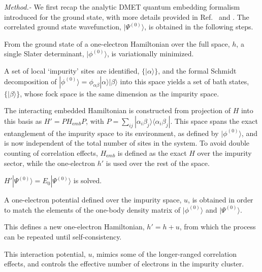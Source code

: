 \documentclass[aps,showpacs,twocolumn,nobibnotes]{revtex4}
\begin{document}
\emph{Method.-} We first recap the analytic DMET quantum embedding formalism introduced for the ground state, with more details provided in
Ref.~ and . The correlated ground state wavefunction, $|\Psi^{(0)} \rangle$, is obtained in the following steps.
\begin{inparaenum}
\item From the ground state of a one-electron Hamiltonian over the full space, $h$, a single Slater determinant, $|\phi^{(0)}\rangle$, is variationally minimized.
\item A set of local `impurity' sites are identified, $\{ |\alpha \rangle \}$, and the formal Schmidt decomposition of $|\phi^{(0)}\rangle = \phi_{\alpha \beta} |\alpha \rangle |\beta \rangle$ into this space
yields a set of bath states, $\{ |\beta \rangle \}$, whose fock space is the same dimension as the impurity space.
\item The interacting embedded Hamiltonian is constructed from projection of $H$ into this basis as $H'=PH_{\mathrm emb}P$, with $P = \sum_{i j} |\alpha_i \beta_j \rangle \langle \alpha_i \beta_j |$. This space spans the exact entanglement of the impurity space to its environment, as defined by $|\phi^{(0)}\rangle$, and is now independent of the total number of sites in the system. To avoid double counting
of correlation effects, $H_{\mathrm emb}$ is defined as the exact $H$ over the impurity sector, while the one-electron $h'$ is used over the rest of the space.
\item $H'|\Psi^{(0)} \rangle = E_0 |\Psi^{(0)} \rangle$ is solved.
\item A one-electron potential defined over the impurity space, $u$, is obtained in order to match the elements of the one-body density matrix of $|\phi^{(0)}\rangle$ and $|\Psi^{(0)} \rangle$.
\item This defines a new one-electron Hamiltonian, $h' = h + u$, from which the process can be repeated until self-consistency.
\end{inparaenum}
This interaction potential, $u$, mimics some of the longer-ranged correlation effects, and controls the effective number of electrons in the impurity cluster.
\end{document}
